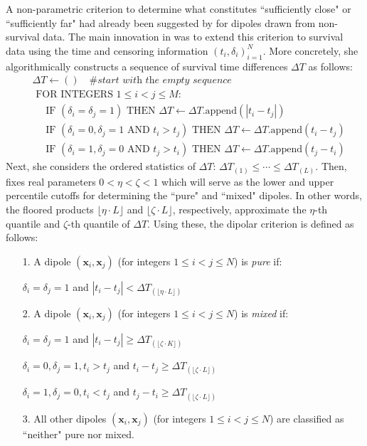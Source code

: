 \documentclass[12pt]{amsart}
\theoremstyle{definition}
\theoremstyle{plain}
\theoremstyle{remark}
\begin{document}
A non-parametric criterion to determine what constitutes ``sufficiently close" or ``sufficiently far" had already been suggested by \cite{bobrowskikretowski} for dipoles drawn from non-survival data. The main innovation in \cite{kretowska} was to extend this criterion to survival data using the time and censoring information $(t_i, \delta_i)_{i = 1}^N$. More concretely, she algorithmically constructs a sequence of survival time differences $\Delta T$ as follows:
\begin{align*}
&\Delta T \leftarrow () \quad \textit{\# start with the empty sequence} \\
&\text{ FOR INTEGERS } 1 \leq i < j \leq M: \\
&\quad \text{ IF } (\delta_i = \delta_j = 1) \text{ THEN } \Delta T \leftarrow \Delta T.\text{append}(|t_i - t_j|) \\
&\quad \text{ IF } (\delta_i = 0, \delta_j = 1 \text{ AND } t_i > t_j) \text{ THEN } \Delta T \leftarrow \Delta T.\text{append}(t_i - t_j) \\
&\quad \text{ IF } (\delta_i = 1, \delta_j = 0 \text{ AND } t_j > t_i) \text{ THEN } \Delta T \leftarrow \Delta T.\text{append}(t_j - t_i)
\end{align*} Next, she considers the ordered statistics of $\Delta T$: $\Delta T_{(1)} \leq \cdots \leq \Delta T_{(L)}$. Then, \cite{kretowska} fixes real parameters $0 < \eta < \zeta < 1$ which will serve as the lower and upper percentile cutoffs for determining the ``pure" and ``mixed" dipoles. In other words, the floored products $\lfloor \eta \cdot L \rfloor$ and $\lfloor \zeta \cdot L \rfloor$, respectively, approximate the $\eta$-th quantile and $\zeta$-th quantile of $\Delta T$. Using these, the dipolar criterion is defined as follows:
\begin{itemize}
	\item[1.] A dipole $(\mathbf{x}_i, \mathbf{x}_j)$ (for integers $1 \leq i < j \leq N$) is \emph{pure} if:
	
	$\delta_i = \delta_j = 1$ and $|t_i - t_j| < \Delta T_{(\lfloor \eta \cdot L \rfloor)}$
	
	\item[2.] A dipole $(\mathbf{x}_i, \mathbf{x}_j)$ (for integers $1 \leq i < j \leq N$) is \emph{mixed} if:
	
	$\delta_i = \delta_j = 1$ and $|t_i - t_j| \geq \Delta T_{(\lfloor \zeta \cdot K \rfloor)}$
	
	$\delta_i = 0, \delta_j = 1, t_i > t_j$ and $t_i - t_j \geq \Delta T_{(\lfloor \zeta \cdot L \rfloor)}$
	
	$\delta_i = 1, \delta_j = 0, t_i < t_j$ and $t_j - t_i \geq \Delta T_{(\lfloor \zeta \cdot L \rfloor)}$
	
	\item[3.] All other dipoles $(\mathbf{x}_i, \mathbf{x}_j)$ (for integers $1 \leq i < j \leq N$) are classified as ``neither" pure nor mixed.
\end{itemize}
\end{document}
